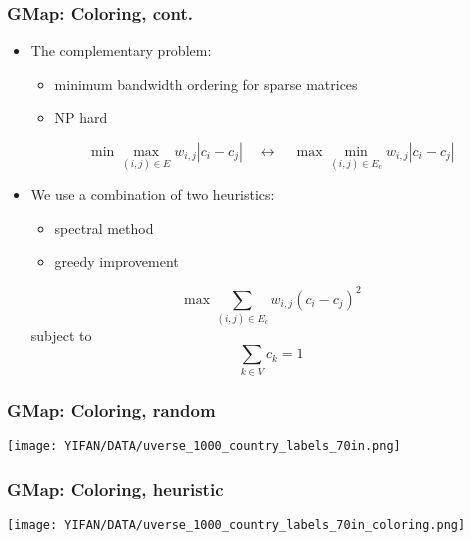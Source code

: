 \documentclass{beamer}
\begin{document}
\begin{frame}[plain]
\frametitle{ GMap: Coloring, cont.}
\begin{itemize}

\item{} The complementary problem:
\begin{itemize}
\item minimum bandwidth ordering for sparse matrices
\item NP hard
\end{itemize}
\begin{block}{}$$\min  \max_{(i,j)\in E}w_{i,j} \left|c_i - c_j\right|\quad \longleftrightarrow \quad \max \min _{(i,j)\in E_c}w_{i,j} \left|c_i - c_j\right|$$ \end{block}

\item{} We use a combination of two heuristics:
\begin{itemize}
\item spectral method
\item greedy improvement
\end{itemize}


\begin{block}{}
$$\max  \sum_{(i,j)\in E_c} w_{i,j} \left(c_i-c_j\right)^2$$
{subject to} $$\sum_{k\in V}  c_k = 1$$
\end{block}



\end{itemize}
\end{frame}

\begin{frame}[plain]
\frametitle{GMap: Coloring, random}
\begin{center}
\texttt{[image: YIFAN/DATA/uverse\_1000\_country\_labels\_70in.png]}
\end{center}
\end{frame}

\begin{frame}[plain]
\frametitle{GMap: Coloring, heuristic}
\begin{center}
\texttt{[image: YIFAN/DATA/uverse\_1000\_country\_labels\_70in\_coloring.png]}
\end{center}
\end{frame}
\end{document}

